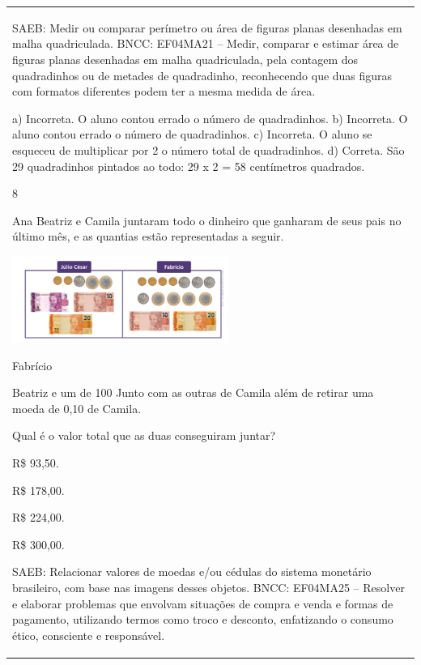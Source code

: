 \begin{mdframed}[linewidth=2pt,linecolor=salmao,roundcorner=2pt]
\begin{escolha}
{{{\begin{longtable}[]{@{}l@{}}
\begin{itemize}
{SAEB: Medir ou comparar perímetro ou área de figuras planas
desenhadas em malha quadriculada.
BNCC: EF04MA21 -- Medir, comparar e estimar área de figuras planas desenhadas em malha quadriculada,
pela contagem dos quadradinhos ou de metades de quadradinho, reconhecendo que duas figuras
com formatos diferentes podem ter a mesma medida de área.

a) Incorreta. O aluno contou errado o número de quadradinhos.
b) Incorreta. O aluno contou errado o número de quadradinhos.
c) Incorreta. O aluno se esqueceu de multiplicar por 2 o número total de quadradinhos.
d) Correta. São 29 quadradinhos pintados ao todo: 29 x 2 = 58 centímetros quadrados.

\num{8}

Ana Beatriz e Camila juntaram todo o dinheiro que ganharam de seus pais no
último mês, e as quantias estão representadas a seguir.


\includegraphics[width=2.77564in,height=1.11703in]{media/image145.png}

Fabrício

Beatriz e um de 100 Junto com as outras de Camila além de retirar uma
moeda de 0,10 de Camila.

Qual é o valor total que as duas conseguiram juntar?

\begin{escolha}
\item
  R\$ 93,50.
\item
  R\$ 178,00.
\item
  R\$ 224,00.
\item
  R\$ 300,00.
\end{escolha}

SAEB: Relacionar valores de moedas e/ou cédulas do sistema
monetário brasileiro, com base nas imagens desses objetos.
BNCC: EF04MA25 -- Resolver e elaborar problemas que envolvam situações de compra e venda e formas
de pagamento, utilizando termos como troco e desconto, enfatizando o consumo ético, consciente e
responsável.

}
\end{itemize}
\end{longtable}}}}
\end{escolha}
\end{mdframed}

